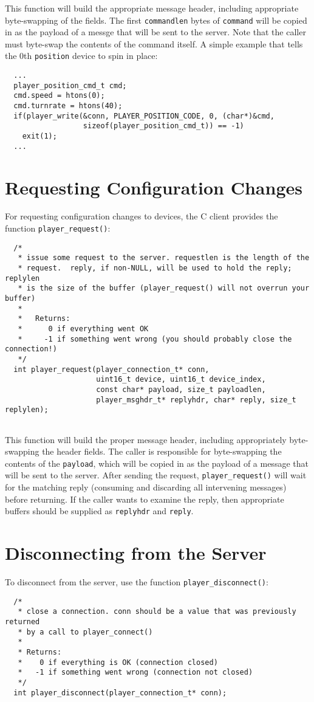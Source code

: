 \documentclass[11pt]{report}
\begin{document}
This function will build the appropriate message header, including
appropriate byte-swapping of the fields.  The first {\tt commandlen}
bytes of {\tt command} will be copied in as the payload of a messge that
will be sent to the server.  Note that the caller must byte-swap
the contents of the command itself.  A simple example that tells the
0th {\tt position} device to spin in place:

{\small
\begin{verbatim}
  ...
  player_position_cmd_t cmd;
  cmd.speed = htons(0);
  cmd.turnrate = htons(40);
  if(player_write(&conn, PLAYER_POSITION_CODE, 0, (char*)&cmd, 
                  sizeof(player_position_cmd_t)) == -1)
    exit(1);
  ...
\end{verbatim}
}

\section{Requesting Configuration Changes}
For requesting configuration changes to devices, the C client provides
the function {\tt player\_request()}:

{\small
\begin{verbatim}
  /*
   * issue some request to the server. requestlen is the length of the 
   * request.  reply, if non-NULL, will be used to hold the reply; replylen
   * is the size of the buffer (player_request() will not overrun your buffer)
   *
   *   Returns:
   *      0 if everything went OK
   *     -1 if something went wrong (you should probably close the connection!)
   */
  int player_request(player_connection_t* conn, 
                     uint16_t device, uint16_t device_index, 
                     const char* payload, size_t payloadlen, 
                     player_msghdr_t* replyhdr, char* reply, size_t replylen);
  
\end{verbatim}
}

This function will build the proper message header, including appropriately
byte-swapping the header fields.  The caller is responsible for byte-swapping
the contents of the {\tt payload}, which will be copied in as the payload
of a message that will be sent to the server.  After sending the request,
{\tt player\_request()} will wait for the matching reply (consuming and
discarding all intervening messages) before returning.
If the caller wants to examine the reply, then appropriate buffers should
be supplied as {\tt replyhdr} and {\tt reply}.

\section{Disconnecting from the Server}
To disconnect from the server, use the function {\tt player\_disconnect()}:

{\small
\begin{verbatim}
  /*
   * close a connection. conn should be a value that was previously returned
   * by a call to player_connect()
   *
   * Returns:
   *    0 if everything is OK (connection closed)
   *   -1 if something went wrong (connection not closed)
   */
  int player_disconnect(player_connection_t* conn);
\end{verbatim}
}
\end{document}
